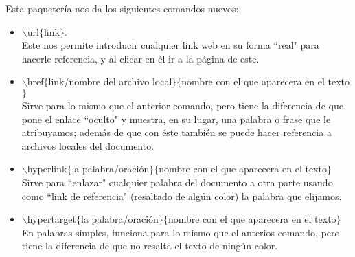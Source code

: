 \documentclass[letterpaper, 12pt]{article}
\begin{document}
\begin{enumerate}
    Esta paquetería nos da los siguientes comandos nuevos:
    
        \begin{itemize}
            \item $\backslash$url$\{$link$\}$.\\
            
            Este nos permite introducir cualquier link web en su forma  ``real" para hacerle referencia, y al clicar en él ir a la página de este.\\
    
            \item $\backslash$href$\{$link/nombre del archivo local$\}$$\{$nombre con el que aparecera en el texto$\}$ \\
            
            Sirve para lo mismo que el anterior comando, pero tiene la diferencia de que pone el enlace ``oculto" y muestra, en su lugar, una palabra o frase que le atribuyamos; además de que con éste también se puede hacer referencia a archivos locales del documento.\\
    
            \item $\backslash$hyperlink$\{$la palabra/oración$\}$$\{$nombre con el que aparecera en el texto$\}$\\
            
            Sirve para ``enlazar" cualquier palabra del documento a otra parte usando como ``link de referencia" (resaltado de algún color) la palabra que elijamos.\\
    
            \item $\backslash$hypertarget$\{$la palabra/oración$\}$$\{$nombre con el que aparecera en el texto$\}$ \\
            
            En palabras simples, funciona para lo mismo que el anterios comando, pero tiene la diferencia de que no resalta el texto de ningún color.\\
        \end{itemize}
    
\end{enumerate}
     \cite{Cita}
     \printbibliography
     
\end{document}
